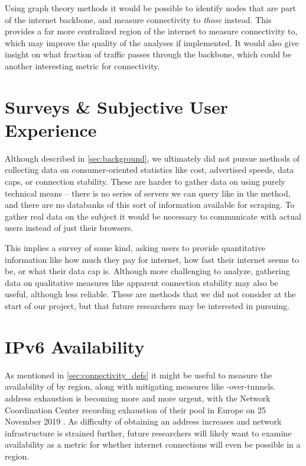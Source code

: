 Using graph theory methods it would be possible to identify nodes that are part of the internet backbone, and measure connectivity to \textit{those} instead. This provides a far more centralized region of the internet to measure connectivity to, which may improve the quality of the analyses if implemented. It would also give insight on what fraction of traffic passes through the backbone, which could be another interesting metric for connectivity.

\section{Surveys \& Subjective User Experience}

Although described in \cref{sec:background}, we ultimately did not pursue methods of collecting data on consumer-oriented statistics like cost, advertised speeds, data caps, or connection stability. These are harder to gather data on using purely technical means -- there is no series of servers we can query like in the \dns method, and there are no databanks of this sort of information available for scraping. To gather real data on the subject it would be necessary to communicate with actual users instead of just their browsers.

This implies a survey of some kind, asking users to provide quantitative information like how much they pay for internet, how fast their internet seems to be, or what their data cap is. Although more challenging to analyze, gathering data on qualitative measures like apparent connection stability may also be useful, although less reliable. These are methods that we did not consider at the start of our project, but that future researchers may be interested in pursuing.

\section{IPv6 Availability}

As mentioned in \cref{sec:connectivity_defs} it might be useful to measure the availability of \ipvs by region, along with mitigating measures like \ipvs-over-\ipvf tunnels. \ipvf address exhaustion is becoming more and more urgent, with the \ripe Network Coordination Center recording exhaustion of their pool in Europe on 25 November 2019 \cite{ReseauxIPEuropeensNetworkCoordinationCentre2019a}. As difficulty of obtaining an \ipvf address increases and network infrastructure is strained further, future researchers will likely want to examine \ipvs availability as a metric for whether internet connections will even be possible in a region.
